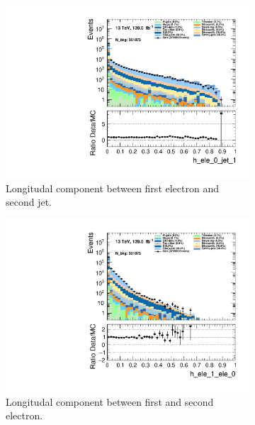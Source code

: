 \begin{figure}
    \centering
    \begin{subfigure}{.49\textwidth}
        \includegraphics[width=\textwidth]{Figures/MC_Data_comp/h_ele_0_jet_1.pdf}
        \caption{Longitudal component between first electron and second jet.}
        \label{fig:h_ele_0_jet_1}
    \end{subfigure}
    \hfill
    \begin{subfigure}{.49\textwidth}
        \includegraphics[width=\textwidth]{Figures/MC_Data_comp/h_ele_1_ele_0.pdf}
        \caption{Longitudal component between first and second electron.}
        \label{fig:h_ele_1_ele_0}
    \end{subfigure}
    \hfill 
    \begin{subfigure}{.49\textwidth}

\end{subfigure}
\end{figure}
